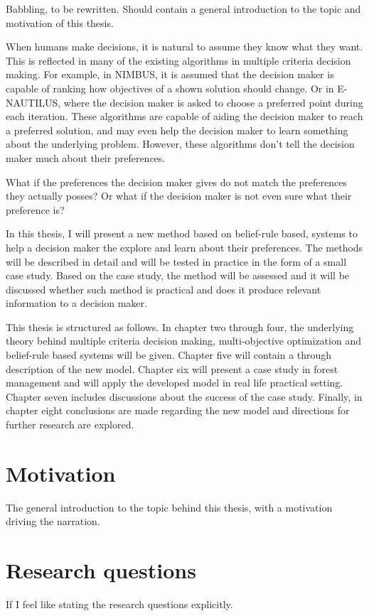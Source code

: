 {\color{red}
Babbling, to be rewritten. Should contain a general introduction to the topic and motivation of this thesis.
}

When humans make decisions, it is natural to assume they know what they want.
This is reflected in many of the existing algorithms in multiple criteria decision making.
For example, in NIMBUS, it is assumed that the decision maker is capable of ranking how objectives
of a shown solution should change. Or in E-NAUTILUS, where the decision maker is asked to choose
a preferred point during each iteration. These algorithms are capable of aiding the decision maker to 
reach a preferred solution, and may even help the decision maker to learn something about the
underlying problem. However, these algorithms don't tell the decision maker much about
their preferences.

What if the preferences the decision maker gives do not match the preferences they
actually posses? Or what if the decision maker is not even sure what their preference is?

In this thesis, I will present a new method based on belief-rule based, systems to help a decision maker
the explore and learn about their preferences. The methods will be described in detail and will be tested in
practice in the form of a small case study. Based on the case study, the method will be assessed and
it will be discussed whether such method is practical and does it produce relevant information to a
decision maker.

This thesis is structured as follows. In chapter two through four, the underlying theory behind multiple
criteria decision making, multi-objective optimization and belief-rule based systems will be given. Chapter
five will contain a through description of the new model. Chapter six will present a case study in forest
management and will apply the developed model in real life practical setting. Chapter seven includes
discussions about the success of the case study. Finally, in chapter eight conclusions are made regarding
the new model and directions for further research are explored.

\section{Motivation}
{\color{red}
The general introduction to the topic behind this thesis, with a motivation driving the narration.
}

\section{Research questions}
{\color{red}
If I feel like stating the research questions explicitly.
}

